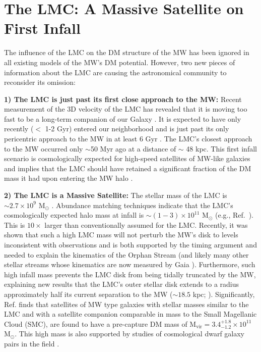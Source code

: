 \documentclass[letterpaper,11pt]{article}
\begin{document}
\section{The LMC: A Massive Satellite on First Infall}\label{sec:massivesat}

The influence of the LMC on the DM structure of the MW has been ignored in all existing models of the MW's DM potential. However, two new pieces of information about the LMC are causing the astronomical community to reconsider its omission:

{\bf 1) The LMC is just past its first close approach to the MW:} Recent measurement of the 3D velocity of the LMC has revealed that it is moving too fast to be a long-term companion of our Galaxy \citep{Kallivayalil:2013}.  It is expected to have only recently ($<$ 1-2 Gyr) entered our neighborhood and is just past its only pericentric approach to the MW in at least 6 Gyr \citep{Besla:2007}. The LMC's closest approach to the MW occurred only
$\sim$50 Myr ago at a distance of $\sim$ 48 kpc.
This first infall scenario is cosmologically expected
for high-speed satellites of MW-like galaxies \citep{Boylan:2011,Busha:2011,Patel:2017}
and implies that the LMC should have retained a significant fraction of the DM mass it had upon entering the MW halo \citep{G19}.

{\bf 2) The LMC is a Massive Satellite:}
The stellar mass of the LMC is $\sim 2.7 \times 10^9$ M$_\odot$ \citep{van:09}.  
Abundance matching techniques indicate that the LMC's cosmologically expected halo mass at infall is  $\sim (1-3) \times 10^{11}$ M$_\odot$ (e.g., Ref.~\cite{Moster:2013}).  This is $10\times$ larger than conventionally assumed for the LMC. Recently, it was shown that such a high LMC mass will not perturb the MW's disk to levels inconsistent with observations \citep{Laporte:2018} and is both supported by the timing argument \citep{Penarrubia:2016} and needed to explain the kinematics of the Orphan Stream \citep{Erkal:2019} (and likely many other stellar streams whose kinematics are now measured by Gaia \citep{Shipp:2019}).
Furthermore, such high infall mass
prevents the LMC disk from being tidally truncated by the MW, explaining new results that the LMC's outer stellar disk extends to a radius approximately half its current separation
to the MW ($\sim 18.5$ kpc; \citep{Mackey:2016, Besla:2016}). 
Significantly, Ref. \cite{Shao:2018} finds that
satellites of MW type galaxies 
with stellar masses similar to the LMC and with a satellite companion
comparable in mass to the Small Magellanic Cloud (SMC), are found to have a pre-capture DM mass of
M$_{\textrm{vir}}=3.4^{+1.8}_{-1.2} \times 10^{11} $M$_{\odot}$. This high mass
is also 
supported by studies of cosmological dwarf galaxy pairs in the field \citep{Besla:2018}. 
\end{document}
